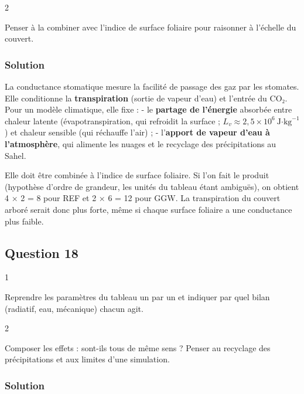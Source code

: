 \documentclass[11pt,a4paper]{article}
\begin{document}
\begin{indication}{2}

Penser à la combiner avec l'indice de surface foliaire pour raisonner à l'échelle du couvert.

\end{indication}

\hypertarget{solution-50}{%
\subsubsection{Solution}\label{solution-50}}

La conductance stomatique mesure la facilité de passage des gaz par les stomates. Elle conditionne la \textbf{transpiration} (sortie de vapeur d'eau) et l'entrée du CO₂. Pour un modèle climatique, elle fixe :
- le \textbf{partage de l'énergie} absorbée entre chaleur latente (évapotranspiration, qui refroidit la surface ; \(L_v\approx2{,}5\times10^6\ \text{J·kg}^{-1}\)) et chaleur sensible (qui réchauffe l'air) ;
- l'\textbf{apport de vapeur d'eau à l'atmosphère}, qui alimente les nuages et le recyclage des précipitations au Sahel.

Elle doit être combinée à l'indice de surface foliaire. Si l'on fait le produit (hypothèse d'ordre de grandeur, les unités du tableau étant ambiguës), on obtient 4 × 2 = 8 pour REF et 2 × 6 = 12 pour GGW. La transpiration du couvert arboré serait donc plus forte, même si chaque surface foliaire a une conductance plus faible.

\hypertarget{question-18}{%
\subsection{Question 18}\label{question-18}}

\begin{indication}{1}

Reprendre les paramètres du tableau un par un et indiquer par quel bilan (radiatif, eau, mécanique) chacun agit.

\end{indication}

\begin{indication}{2}

Composer les effets : sont-ils tous de même sens ? Penser au recyclage des précipitations et aux limites d'une simulation.

\end{indication}

\hypertarget{solution-51}{%
\subsubsection{Solution}\label{solution-51}}
\end{document}
